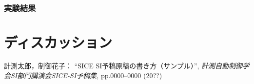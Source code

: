 \documentclass[a4paper]{jarticle}
\begin{document}
\subsubsection{実験結果}
\section{ディスカッション}
%
%
\begin{thebibliography}{99}
	計測太郎，制御花子：
	``SICE SI予稿原稿の書き方（サンプル）'',  
   {\it 計測自動制御学会SI部門講演会SICE-SI予稿集}, 
    pp.0000--0000 (20??)
\end{thebibliography}
%
%
%
\end{document}
